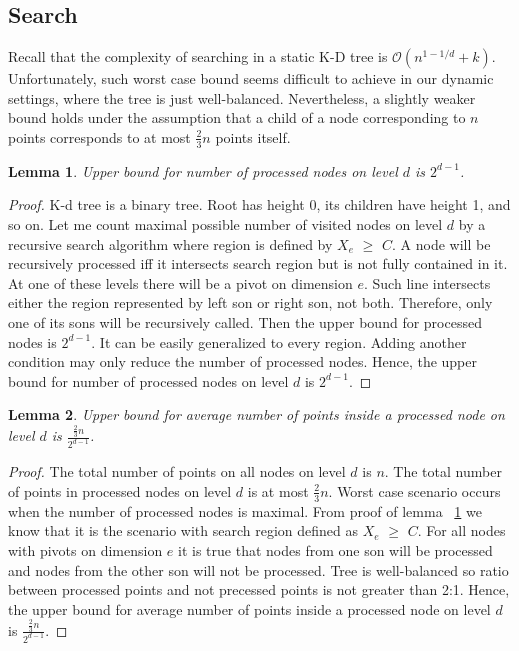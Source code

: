 \documentclass[10pt,a4paper]{article}
\newtheorem{lemma}{Lemma}
\newcommand{\Oh}{\mathcal{O}}
\begin{document}
\subsection{Search}

Recall that the complexity of searching in a static K-D tree is $\Oh(n^{1-1/d} + k)$. Unfortunately, such worst case bound seems difficult to achieve in our dynamic settings, where the tree is just well-balanced. Nevertheless, a slightly weaker bound holds under the assumption that a child of a node corresponding to $n$ points corresponds to at most $\frac{2}{3}n$ points itself.

\begin{lemma}\label{lem:3}
Upper bound for number of processed nodes on level $d$ is $2^{d-1}$.
\end{lemma}

\begin{proof}

K-d tree is a binary tree. Root has height 0, its children have height 1, and so on. Let me count maximal possible number of visited nodes on level $d$ by a recursive search algorithm where region is defined by $X_e$ $\geq$ $C$. A node will be recursively processed iff it intersects search region but is not fully contained in it. At one of these levels there will be a pivot on dimension $e$. Such line intersects either the region represented by left son or right son, not both. Therefore, only one of its sons will be recursively called. Then the upper bound for processed nodes is $2^{d-1}$. It can be easily generalized to every region. Adding another condition may only reduce the number of processed nodes. Hence, the upper bound for number of processed nodes on level $d$ is $2^{d-1}$. 
\end{proof}


\begin{lemma}\label{lem:4}
Upper bound for average number of points inside a processed node on level $d$ is $\frac{\frac{2}{3}n}{2^{d-1}}$.
\end{lemma}

\begin{proof}

The total number of points on all nodes on level $d$ is $n$. The total number of points in processed nodes on level $d$ is at most $\frac{2}{3}n$. Worst case scenario occurs when the number of processed nodes is maximal. From proof of lemma ~\ref{lem:3} we know that it is the scenario with search region defined as $X_e$ $\geq$ $C$. For all nodes with pivots on dimension $e$ it is true that nodes from one son will be processed and nodes from the other son will not be processed. Tree is well-balanced so ratio between processed points and not precessed points is not greater than 2:1. Hence, the upper bound for average number of points inside a processed node on level $d$ is $\frac{\frac{2}{3}n}{2^{d-1}}$.
\end{proof}
\end{document}
